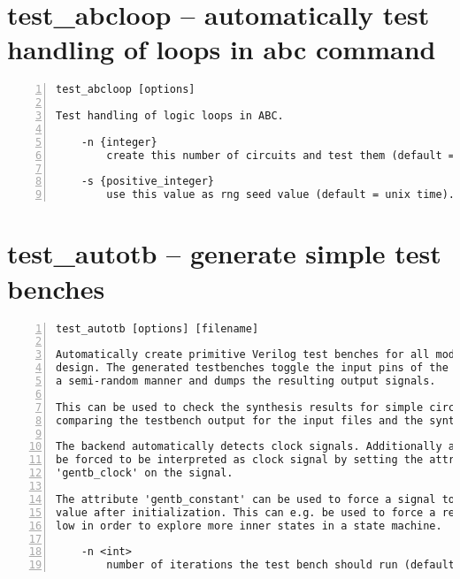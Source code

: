 \section{test\_abcloop -- automatically test handling of loops in abc command}
\label{cmd:test_abcloop}
\begin{lstlisting}[numbers=left,frame=single]
    test_abcloop [options]

Test handling of logic loops in ABC.

    -n {integer}
        create this number of circuits and test them (default = 100).

    -s {positive_integer}
        use this value as rng seed value (default = unix time).
\end{lstlisting}

\section{test\_autotb -- generate simple test benches}
\label{cmd:test_autotb}
\begin{lstlisting}[numbers=left,frame=single]
    test_autotb [options] [filename]

Automatically create primitive Verilog test benches for all modules in the
design. The generated testbenches toggle the input pins of the module in
a semi-random manner and dumps the resulting output signals.

This can be used to check the synthesis results for simple circuits by
comparing the testbench output for the input files and the synthesis results.

The backend automatically detects clock signals. Additionally a signal can
be forced to be interpreted as clock signal by setting the attribute
'gentb_clock' on the signal.

The attribute 'gentb_constant' can be used to force a signal to a constant
value after initialization. This can e.g. be used to force a reset signal
low in order to explore more inner states in a state machine.

    -n <int>
        number of iterations the test bench should run (default = 1000)
\end{lstlisting}

